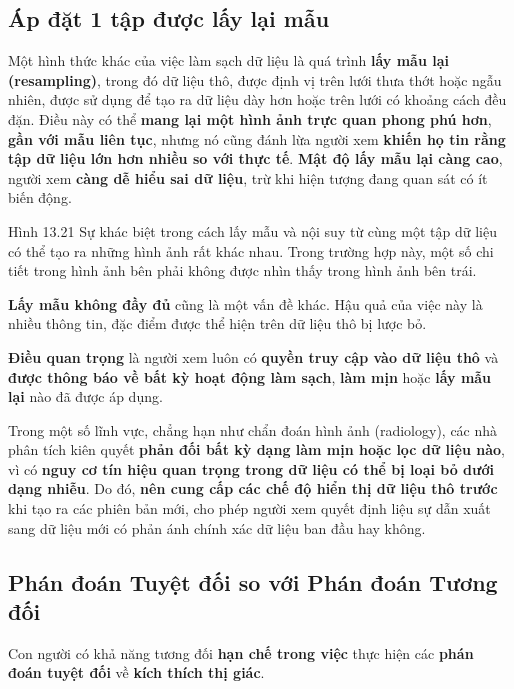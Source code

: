 \subsection{Áp đặt 1 tập được lấy lại
mẫu}\label{uxe1p-ux111ux1eb7t-1-tux1eadp-ux111ux1b0ux1ee3c-lux1ea5y-lux1ea1i-mux1eabu}

Một hình thức khác của việc làm sạch dữ liệu là quá trình \textbf{lấy
mẫu lại (resampling)}, trong đó dữ liệu thô, được định vị trên lưới thưa
thớt hoặc ngẫu nhiên, được sử dụng để tạo ra dữ liệu dày hơn hoặc trên
lưới có khoảng cách đều đặn. Điều này có thể \textbf{mang lại một hình
ảnh trực quan phong phú hơn}, \textbf{gần với mẫu liên tục}, nhưng nó
cũng đánh lừa người xem \textbf{khiến họ tin rằng tập dữ liệu lớn hơn
nhiều so với thực tế}. \textbf{Mật độ lấy mẫu lại càng cao}, người xem
\textbf{càng dễ hiểu sai dữ liệu}, trừ khi hiện tượng đang quan sát có
ít biến động.

Hình 13.21 Sự khác biệt trong cách lấy mẫu và nội suy từ cùng một tập dữ
liệu có thể tạo ra những hình ảnh rất khác nhau. Trong trường hợp này,
một số chi tiết trong hình ảnh bên phải không được nhìn thấy trong hình
ảnh bên trái.

\textbf{Lấy mẫu không đầy đủ} cũng là một vấn đề khác. Hậu quả của việc
này là nhiều thông tin, đặc điểm được thể hiện trên dữ liệu thô bị lược
bỏ.

\textbf{Điều quan trọng} là người xem luôn có \textbf{quyền truy cập vào
dữ liệu thô} và \textbf{được thông báo về bất kỳ hoạt động làm sạch},
\textbf{làm mịn} hoặc \textbf{lấy mẫu lại} nào đã được áp dụng.

Trong một số lĩnh vực, chẳng hạn như chẩn đoán hình ảnh (radiology), các
nhà phân tích kiên quyết \textbf{phản đối bất kỳ dạng làm mịn hoặc lọc
dữ liệu nào}, vì có \textbf{nguy cơ tín hiệu quan trọng trong dữ liệu có
thể bị loại bỏ dưới dạng nhiễu}. Do đó, \textbf{nên cung cấp các chế độ
hiển thị dữ liệu thô trước} khi tạo ra các phiên bản mới, cho phép người
xem quyết định liệu sự dẫn xuất sang dữ liệu mới có phản ánh chính xác
dữ liệu ban đầu hay không.

\subsection{Phán đoán Tuyệt đối so với Phán đoán Tương
đối}\label{phuxe1n-ux111ouxe1n-tuyux1ec7t-ux111ux1ed1i-so-vux1edbi-phuxe1n-ux111ouxe1n-tux1b0ux1a1ng-ux111ux1ed1i}

Con người có khả năng tương đối \textbf{hạn chế trong việc} thực hiện
các \textbf{phán đoán tuyệt đối} về \textbf{kích thích thị giác}.

